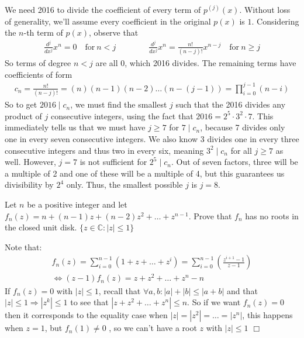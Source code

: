 \begin{solution}[8]
    We need 2016 to divide the coefficient of every term of $p^{(j)}(x)$. Without loss of generality, we'll assume every coefficient in the original $p(x)$ is $1$. Considering the $n$-th term of $p(x)$, observe that
    \begin{align*}
        \frac{d^j}{dx^j}x^n = 0 \quad \text{for}\ n < j \qquad \qquad \frac{d^j}{dx^j}x^n = \frac{n!}{(n-j)!}x^{n-j} \quad \text{for}\ n \geq j
    \end{align*}
    So terms of degree $n<j$ are all $0$, which 2016 divides. The remaining terms have coefficients of form
    \begin{align*}
        c_n = \frac{n!}{(n-j)!} = (n)(n-1)(n-2)\dots(n-(j-1)) = \prod_{i=0}^{j-1}(n-i)
    \end{align*}
    So to get $2016 \mid c_n$, we must find the smallest $j$ such that the 2016 divides any product of $j$ consecutive integers, using the fact that $2016 = 2^5 \cdot 3^2 \cdot 7$. This immediately tells us that we must have $j \geq 7$ for $7 \mid c_n$, because 7 divides only one in every seven consecutive integers. We also know 3 divides one in every three consecutive integers and thus two in every six, meaning $3^2 \mid c_n$ for all $j \geq 7$ as well. However, $j = 7$ is not sufficient for $2^5 \mid c_n$. Out of seven factors, three will be a multiple of 2 and one of these will be a multiple of 4, but this guarantees us divisibility by $2^4$ only. Thus, the smallest possible $j$ is $j =\boxed{8}$.
\end{solution}

\begin{problem}[D][7][Putnam 2018 B2]
    Let $n$ be a positive integer and let $f_n(z)=n+(n-1)z+(n-2)z^2+\ldots+z^{n-1}$. Prove that $f_n$ has no roots in the closed unit disk. $\{z \in \mathbb{C}:|z| \leq 1 \}$
\end{problem}

\begin{solution}
    Note that:
    \begin{align*}
        f_n(z)=\sum_{i=0}^{n-1}(1+z+\ldots+z^i) = \sum_{i=0}^{n-1}\left(\frac{z^{i+1}-1}{z-1}\right)\\
        \iff (z-1)f_n(z)=z+z^2+\ldots+z^n-n
    \end{align*}
    If $f_n(z)=0$ with $|z|\leq 1$, recall that $\forall a,b :|a|+|b|\leq|a+b|$ and that $|z|\leq 1 \Rightarrow|z^k| \leq 1$ to see that $|z+z^2+\ldots+z^n| \leq n$. So if we want $f_n(z)=0$ then it corresponds to the equality case when $|z|=|z^2|=\ldots=|z^n|$, this happens when $z=1$, but $f_n(1) \neq 0$ , so we can't have a root $z$ with $|z| \leq 1$ $\Box$
\end{solution}

